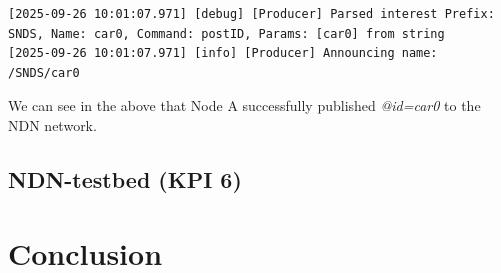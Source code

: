 \documentclass{article}
\begin{document}
\begin{lstlisting}[language=log,caption={Configured publish operations for each Node},label={lst:local-publish-inside-a}]
[2025-09-26 10:01:07.971] [debug] [Producer] Parsed interest Prefix: SNDS, Name: car0, Command: postID, Params: [car0] from string
[2025-09-26 10:01:07.971] [info] [Producer] Announcing name: /SNDS/car0
\end{lstlisting}

We can see in the above that Node A successfully published \textit{@id=car0} to the NDN network.






\subsection{NDN-testbed (KPI 6)}
\section{Conclusion}
\end{document}
